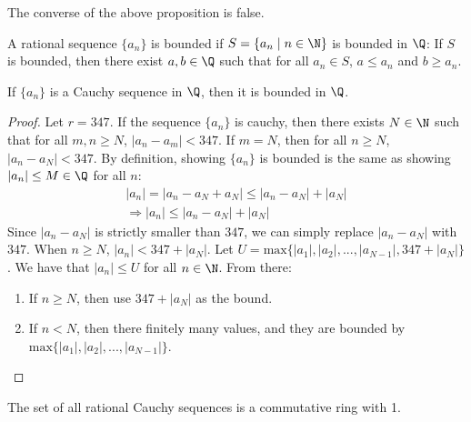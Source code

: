 \documentclass[10pt]{article}
\begin{document}
\begin{remark}
    The converse of the above proposition is false.
\end{remark}
\begin{definition}[bounded]
    A rational sequence $\{a_n\}$ is bounded if $S=\{ a_n\mid n\in \N \}$ is bounded in $\Q$: If $S$ is bounded, then there exist $ a,b\in\Q$ such that for all $a_n\in S$, $a\leq a_n$ and $b\geq a_n$.
\end{definition}
\begin{lemma}
    If $\{a_n\}$ is a Cauchy sequence in $\Q$, then it is bounded in $\Q$.
\end{lemma}
\begin{proof}
    Let $r=347$. If the sequence $\{a_n\}$ is cauchy, then there exists $N\in\N$ such that for all $m,n\geq N$, $|a_n-a_m|<347$. If $m=N$, then for all $n\geq N$, $|a_n-a_N|<347$. By definition, showing $\{a_n\}$ is bounded is the same as showing $|a_n|\leq M\in \Q$ for all $n$:
    \begin{align*}
        |a_n|=|a_n-a_N+a_N|\leq |a_n-a_N|+|a_N|\\
        \Rightarrow |a_n|\leq |a_n-a_N|+|a_N|
    \end{align*}
    Since $|a_n-a_N|$ is strictly smaller than $347$, we can simply replace $|a_n-a_N|$ with $347$. When $n\geq N$, $|a_n|<347+|a_N|$. Let $U=\text{max}\{|a_1|,|a_2|,...,|a_{N-1}|, 347+|a_N|\}$. We have that $|a_n|\leq U$ for all $ n\in \N$. From there:
    \begin{enumerate}
        \item[\circled{1}] If $n\geq N$, then use $347+|a_N|$ as the bound. 
        \item[\circled{2}] If $n<N$, then there finitely many values, and they are bounded by $\text{max}\{|a_1|,|a_2|,...,|a_{N-1}|\}$.
    \end{enumerate}
\end{proof}
\begin{proposition}
    The set of all rational Cauchy sequences is a commutative ring with 1.
\end{proposition}
\end{document}
